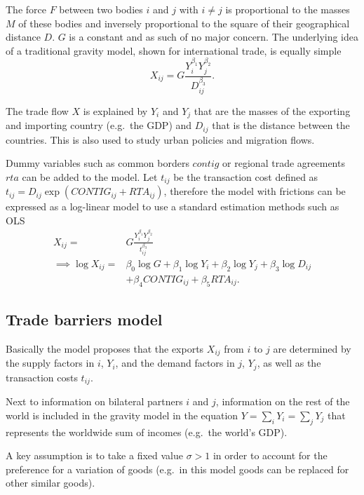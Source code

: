 \documentclass[12pt,reqno,oneside,pdftex]{formato-puc/puctesis} %
\begin{document}
The force \(F\) between two bodies \(i\) and \(j\) with \(i \neq j\) is
proportional to the masses \(M\) of these bodies and inversely
proportional to the square of their geographical distance \(D\). \(G\)
is a constant and as such of no major concern. The underlying idea of a
traditional gravity model, shown for international trade, is equally
simple \begin{equation*}
X_{ij}=G\frac{Y_{i}^{\beta_{1}}Y_{j}^{\beta_{2}}}{D_{ij}^{\beta_{3}}}.
\end{equation*}

The trade flow \(X\) is explained by \(Y_{i}\) and \(Y_{j}\) that are
the masses of the exporting and importing country (e.g.~the GDP) and
\(D_{ij}\) that is the distance between the countries. This is also used
to study urban policies and migration flows.

Dummy variables such as common borders \(contig\) or regional trade
agreements \(rta\) can be added to the model. Let \(t_{ij}\) be the
transaction cost defined as
\(t_{ij}= D_{ij} \exp(CONTIG_{ij} + RTA_{ij})\), therefore the model
with frictions can be expressed as a log-linear model to use a standard
estimation methods such as OLS \begin{align*}
X_{ij} =& G\frac{Y_{i}^{\beta_{1}}Y_{j}^{\beta_{2}}}{t_{ij}^{\beta_{3}}} \\
\implies \log X_{ij} =& \beta_{0}\log G +\beta_{1}\log Y_{i}+\beta_{2}\log Y_{j}+\beta_{3}\log D_{ij}\\
&+ \beta_{4}CONTIG_{ij}+\beta_{5}RTA_{ij}.
\end{align*}

\hypertarget{trade-barriers-model}{%
\subsection{Trade barriers model}\label{trade-barriers-model}}

Basically the model proposes that the exports \(X_{ij}\) from \(i\) to
\(j\) are determined by the supply factors in \(i\), \(Y_{i}\), and the
demand factors in \(j\), \(Y_{j}\), as well as the transaction costs
\(t_{ij}\).

Next to information on bilateral partners \(i\) and \(j\), information
on the rest of the world is included in the gravity model in the
equation \(Y=\sum_{i} Y_{i}= \sum_{j} Y_{j}\) that represents the
worldwide sum of incomes (e.g.~the world's GDP).

A key assumption is to take a fixed value \(\sigma > 1\) in order to
account for the preference for a variation of goods (e.g.~in this model
goods can be replaced for other similar goods).
\end{document}
